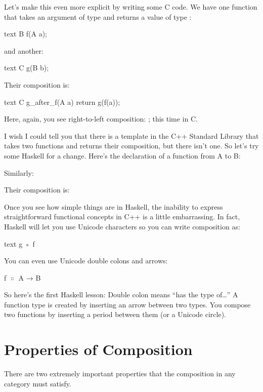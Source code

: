 Let's make this even more explicit by writing some C code. We have one
function  that takes an argument of type  and
returns a value of type :

\begin{snip}{text}
B f(A a);
\end{snip}
and another:

\begin{snip}{text}
C g(B b);
\end{snip}
Their composition is:

\begin{snip}{text}
C g_after_f(A a)
{
    return g(f(a));
}
\end{snip}
Here, again, you see right-to-left composition: ; this
time in C.

I wish I could tell you that there is a template in the C++ Standard
Library that takes two functions and returns their composition, but
there isn't one. So let's try some Haskell for a change. Here's the
declaration of a function from A to B:

Similarly:

Their composition is:

Once you see how simple things are in Haskell, the inability to express
straightforward functional concepts in C++ is a little embarrassing. In
fact, Haskell will let you use Unicode characters so you can write
composition as:
\begin{snip}{text}
g ◦ f
\end{snip}

You can even use Unicode double colons and arrows:
\begin{snipv}
f \ensuremath{\Colon} A → B
\end{snipv}
So here's the first Haskell lesson: Double colon means ``has the type
of\ldots{}'' A function type is created by inserting an arrow between
two types. You compose two functions by inserting a period between them
(or a Unicode circle).

\section{Properties of Composition}

There are two extremely important properties that the composition in any
category must satisfy.

